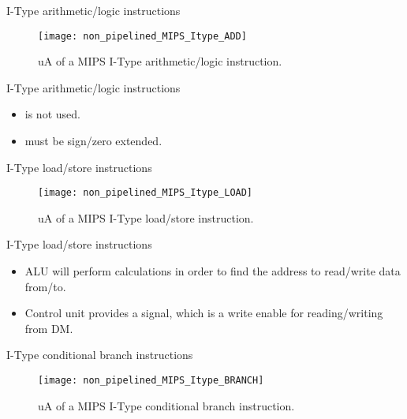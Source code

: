 % 
\begin{frame}{I-Type arithmetic/logic instructions}
  \begin{figure}
  \centering
  \texttt{[image: non\_pipelined\_MIPS\_Itype\_ADD]}
  \vspace{-3pt}
  \caption{\ac{uA} of a \ac{MIPS} I-Type arithmetic/logic instruction.}
  \label{Figure:non_pipelined_MIPS_Itype_ADD}
  \end{figure}
\end{frame}


% 
\begin{frame}{I-Type arithmetic/logic instructions}
\begin{itemize}
\item {} is not used.
\item {} must be sign/zero extended. 
\end{itemize}
\end{frame}


% 
\begin{frame}{I-Type load/store instructions}
  \begin{figure}
  \centering
  \texttt{[image: non\_pipelined\_MIPS\_Itype\_LOAD]}
  \vspace{-3pt}
  \caption{\ac{uA} of a \ac{MIPS} I-Type load/store instruction.}
  \label{Figure:non_pipelined_MIPS_Itype_LOAD}
  \end{figure}
\end{frame}

% 
\begin{frame}{I-Type load/store instructions}
\begin{itemize}
\item \ac{ALU} will perform calculations in order to find the address to read/write data from/to.
\item Control unit provides a  signal, which is a write enable for reading/writing from \ac{DM}.
\end{itemize}
\end{frame}

% 
\begin{frame}{I-Type conditional branch instructions}
  \begin{figure}
  \centering
  \texttt{[image: non\_pipelined\_MIPS\_Itype\_BRANCH]}
  \vspace{-3pt}
  \caption{\ac{uA} of a \ac{MIPS} I-Type conditional branch instruction.}
  \label{Figure:non_pipelined_MIPS_Itype_BRANCH}
  \end{figure}
\end{frame}

